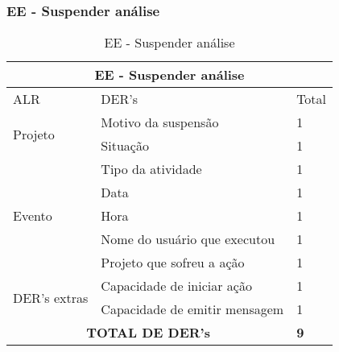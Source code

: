 \subsubsection{EE - Suspender análise}

\begin{table}[!h]
\centering
\caption{EE - Suspender análise}
\label{ee_suspender_analise}
\begin{tabular}{|l|l|l|}
\hline
\multicolumn{3}{|c|}{EE - Suspender análise}                          \\ \hline
ALR                           & DER's                         & Total \\ \hline
\multirow{2}{*}{Projeto}      & Motivo da suspensão           & 1     \\ \cline{2-3} 
                              & Situação                      & 1     \\ \hline
\multirow{5}{*}{Evento}       & Tipo da atividade             & 1     \\ \cline{2-3} 
                              & Data                          & 1     \\ \cline{2-3} 
                              & Hora                          & 1     \\ \cline{2-3} 
                              & Nome do usuário que executou  & 1     \\ \cline{2-3} 
                              & Projeto que sofreu a ação     & 1     \\ \hline
\multirow{2}{*}{DER's extras} & Capacidade de iniciar ação    & 1     \\ \cline{2-3} 
                              & Capacidade de emitir mensagem & 1     \\ \hline
\multicolumn{2}{|c|}{\textbf{TOTAL DE DER's}}                          & \textbf{9}     \\ \hline
\end{tabular}
\end{table}

